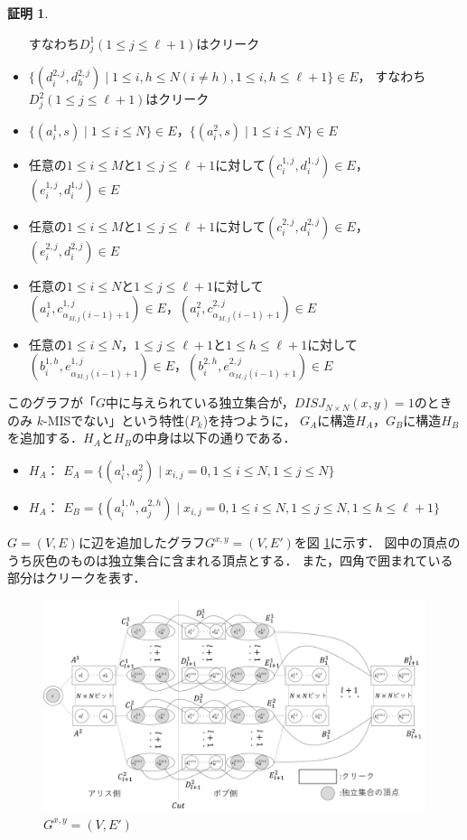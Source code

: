 \documentclass[12pt]{thesis}
\theoremstyle{definition}
\newtheorem*{prf*}{証明}
\begin{document}
\begin{prf*}
\begin{itemize}
すなわち$D^{1}_{j}(1\leq j \leq \ell+1)$はクリーク
\item $\{(d^{2,j}_{i}, d^{2,j}_{h}) \mid 1\leq i,h \leq N(i \neq h),1\leq i,h \leq \ell+1\} \in E$，
すなわち$D^{2}_{j}(1\leq j \leq \ell+1)$はクリーク
\item $\{(a^{1}_{i}, s) \mid 1\leq i \leq N\} \in E$，$\{(a^{2}_{i}, s) \mid 1\leq i \leq N\} \in E$
\item 任意の$1\leq i \leq M$と$1\leq j \leq \ell+1$に対して$(c_{i}^{1, j}, d_{i}^{1, j}) \in E$，
$(e_{i}^{1, j}, d_{i}^{1, j}) \in E$
\item 任意の$1\leq i \leq M$と$1\leq j \leq \ell+1$に対して$(c_{i}^{2, j}, d_{i}^{2, j}) \in E$，
$(e_{i}^{2, j}, d_{i}^{2, j}) \in E$
\item 任意の$1\leq i \leq N$と$1\leq j \leq \ell+1$に対して \\
$\left(a^{1}_{i},c^{1,j}_{\alpha_{M,j}(i-1)+1}\right) \in E$，$\left(a^{2}_{i},c^{2,j}_{\alpha_{M,j}(i-1)+1}\right) \in E$
\item 任意の$1\leq i \leq N$，$1\leq j \leq \ell+1$と$1\leq h \leq \ell+1$に対して \\
$\left(b^{1,h}_{i},e^{1,j}_{\alpha_{M,j}(i-1)+1}\right) \in E$，$\left(b^{2,h}_{i},e^{2,j}_{\alpha_{M,j}(i-1)+1}\right) \in E$
\end{itemize}
このグラフが「$G$中に与えられている独立集合が，$DISJ_{N \times N} (x, y) = 1$のときのみ
$k$-MISでない」という特性($P_{k}$)を持つように，
$G_{A}$に構造$H_{A}$，$G_{B}$に構造$H_{B}$を追加する．$H_{A}$と$H_{B}$の中身は以下の通りである．
\begin{itemize}
\item $H_{A}$： $E_{A}=\{(a^{1}_{i},a^{2}_{j}) \mid x_{i,j}=0, 1 \leq i \leq N, 1 \leq j \leq N\}$
\item $H_{A}$： $E_{B}=\{(a^{1,h}_{i},a^{2,h}_{j}) \mid x_{i,j}=0, 1 \leq i \leq N, 1 \leq j \leq N, 1 \leq h \leq \ell+1\}$
\end{itemize}
$G = (V, E)$に辺を追加したグラフ$G^{x, y} = (V, E')$を図 \ref{k_Gxy}に示す．
図中の頂点のうち灰色のものは独立集合に含まれる頂点とする．
また，四角で囲まれている部分はクリークを表す．

\begin{figure}[ht]
\begin{center}
\includegraphics[width=120mm]{k_Gxy.png}
\end{center}
\caption{$G^{x, y} = (V, E')$}
\label{k_Gxy}
\end{figure}


\end{prf*}
\end{document}
